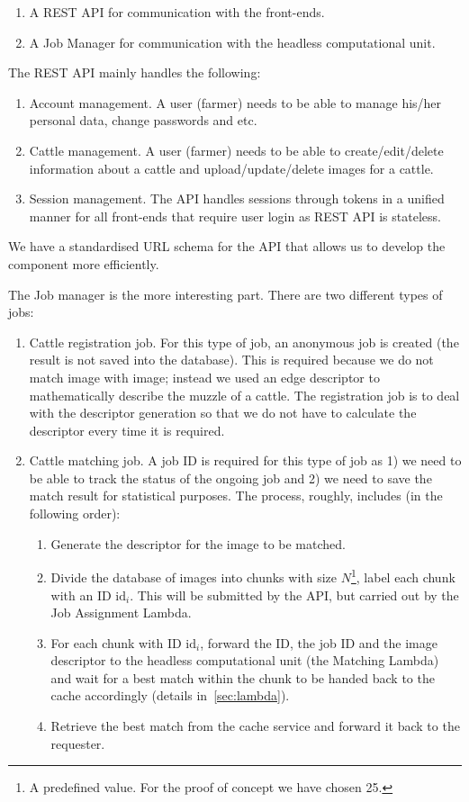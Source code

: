 \begin{enumerate}
	\item A REST API for communication with the front-ends.
	\item A Job Manager for communication with the headless computational unit.
\end{enumerate}

The REST API mainly handles the following:

\begin{enumerate}
	\item Account management. A user (farmer) needs to be able to manage his/her personal data, change passwords and etc.
	\item Cattle management. A user (farmer) needs to be able to create/edit/delete information about a cattle and upload/update/delete images for a cattle. 
	\item Session management. The API handles sessions through tokens in a unified manner for all front-ends that require user login as REST API is stateless.
\end{enumerate}

We have a standardised URL schema for the API that allows us to develop the component more efficiently.

The Job manager is the more interesting part. There are two different types of jobs:

\begin{enumerate}
	\item Cattle registration job. For this type of job, an anonymous job is created (the result is not saved into the database). This is required because we do not match image with image; instead we used an edge descriptor to mathematically describe the muzzle of a cattle. The registration job is to deal with the descriptor generation so that we do not have to calculate the descriptor every time it is required.
	\item Cattle matching job. A job ID is required for this type of job as 1) we need to be able to track the status of the ongoing job and 2) we need to save the match result for statistical purposes. The process, roughly, includes (in the following order):
	\begin{enumerate}
		\item Generate the descriptor for the image to be matched.
		\item Divide the database of images into chunks with size $N$\footnote{A predefined value. For the proof of concept we have chosen 25.}, label each chunk with an ID $\text{id}_i$. This will be submitted by the API, but carried out by the Job Assignment Lambda.
		\item For each chunk with ID $\text{id}_i$, forward the ID, the job ID and the image descriptor to the headless computational unit (the Matching Lambda) and wait for a best match within the chunk to be handed back to the cache accordingly (details in~\ref{sec:lambda}).
		\item Retrieve the best match from the cache service and forward it back to the requester.
	\end{enumerate}
\end{enumerate}

